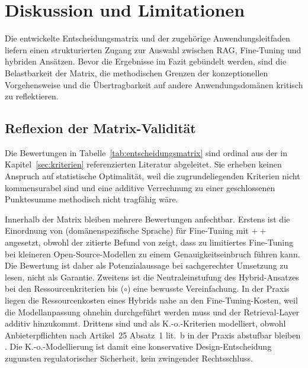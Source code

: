 %

\section{Diskussion und Limitationen}
\label{sec:diskussion}

Die entwickelte Entscheidungsmatrix und der zugehörige Anwendungsleitfaden liefern einen strukturierten Zugang zur Auswahl zwischen RAG, Fine-Tuning und hybriden Ansätzen. Bevor die Ergebnisse im Fazit gebündelt werden, sind die Belastbarkeit der Matrix, die methodischen Grenzen der konzeptionellen Vorgehensweise und die Übertragbarkeit auf andere Anwendungsdomänen kritisch zu reflektieren.

\subsection{Reflexion der Matrix-Validität}

Die Bewertungen in Tabelle~\ref{tab:entscheidungsmatrix} sind ordinal aus der in Kapitel~\ref{sec:kriterien} referenzierten Literatur abgeleitet. Sie erheben keinen Anspruch auf statistische Optimalität, weil die zugrundeliegenden Kriterien nicht kommensurabel sind und eine additive Verrechnung zu einer geschlossenen Punktesumme methodisch nicht tragfähig wäre.

Innerhalb der Matrix bleiben mehrere Bewertungen anfechtbar. Erstens ist die Einordnung von  (domänenspezifische Sprache) für Fine-Tuning mit $++$ angesetzt, obwohl der zitierte Befund von \textcite[10, 26]{Balaguer.2024} zeigt, dass zu limitiertes Fine-Tuning bei kleineren Open-Source-Modellen zu einem Genauigkeitseinbruch führen kann. Die Bewertung ist daher als Potenzialaussage bei sachgerechter Umsetzung zu lesen, nicht als Garantie. Zweitens ist die Neutraleinstufung des Hybrid-Ansatzes bei den Ressourcenkriterien  bis  ($\circ$) eine bewusste Vereinfachung. In der Praxis liegen die Ressourcenkosten eines Hybrids nahe an den Fine-Tuning-Kosten, weil die Modellanpassung ohnehin durchgeführt werden muss und der Retrieval-Layer additiv hinzukommt. Drittens sind  und  als K.-o.-Kriterien modelliert, obwohl Anbieterpflichten nach Artikel~25 Absatz~1 lit.~b in der Praxis abstufbar bleiben \autocite[Erwägungsgrund~109]{EuropaischesParlamentundRat.2024}. Die K.-o.-Modellierung ist damit eine konservative Design-Entscheidung zugunsten regulatorischer Sicherheit, kein zwingender Rechtsschluss.

